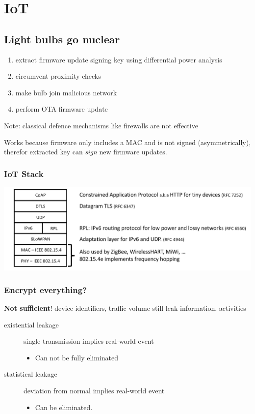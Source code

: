 
\section{IoT}
\subsection{Light bulbs go nuclear}
\begin{enumerate}
    \item extract firmware update signing key using differential power analysis
    \item circumvent proximity checks
    \item make bulb join malicious network
    \item perform OTA firmware update
\end{enumerate}
Note: classical defence mechanisms like firewalls are not effective

Works because firmware only includes a MAC and is not signed (asymmetrically), therefor extracted key can \textit{sign} new firmware updates.

\subsubsection{IoT Stack}
\begin{center}
    \includegraphics[width=\linewidth]{images/iot_stack}
\end{center}

\subsubsection{Encrypt everything?}
\textbf{Not sufficient}! device identifiers, traffic volume still leak information, activities

\begin{description}
  \item[existential leakage] single transmission implies real-world event
    \begin{itemize}
      \item Can not be fully eliminated
    \end{itemize}
  \item[statistical leakage] deviation from normal implies real-world event
    \begin{itemize}
      \item Can be eliminated.
    \end{itemize}
\end{description}

